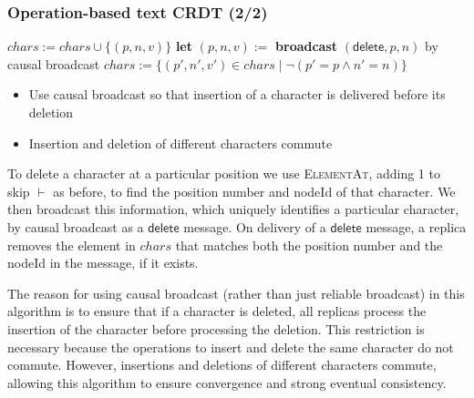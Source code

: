 \begin{frame}
    \label{s:text-crdt-alg2}
    \frametitle{Operation-based text CRDT (2/2)}
    \begingroup\footnotesize
    \begin{algorithmic}
            \State $\mathit{chars} := \mathit{chars} \cup \{(p,n,v)\}$
        \EndOn
        \State
            \State \textbf{let} $(p,n,v) := $ 
            \State \textbf{broadcast} $(\mathsf{delete}, p, n)$ by causal broadcast
        \EndOn
        \State
            \State $\mathit{chars} := \{(p',n',v') \in \mathit{chars} \mid \neg (p' = p \wedge n' = n)\}$
        \EndOn
    \end{algorithmic}
    \endgroup\vspace{1em}
    \begin{itemize}
        \item Use causal broadcast so that insertion of a character is delivered before its deletion
        \item Insertion and deletion of different characters commute
    \end{itemize}
\end{frame}
\label{l:text-crdt-alg2}

To delete a character at a particular position we use \textsc{ElementAt}, adding 1 to skip $\vdash$ as before, to find the position number and nodeId of that character.
We then broadcast this information, which uniquely identifies a particular character, by causal broadcast as a $\mathsf{delete}$ message.
On delivery of a $\mathsf{delete}$ message, a replica removes the element in $\mathit{chars}$ that matches both the position number and the nodeId in the message, if it exists.

The reason for using causal broadcast (rather than just reliable broadcast) in this algorithm is to ensure that if a character is deleted, all replicas process the insertion of the character before processing the deletion.
This restriction is necessary because the operations to insert and delete the same character do not commute.
However, insertions and deletions of different characters commute, allowing this algorithm to ensure convergence and strong eventual consistency.


